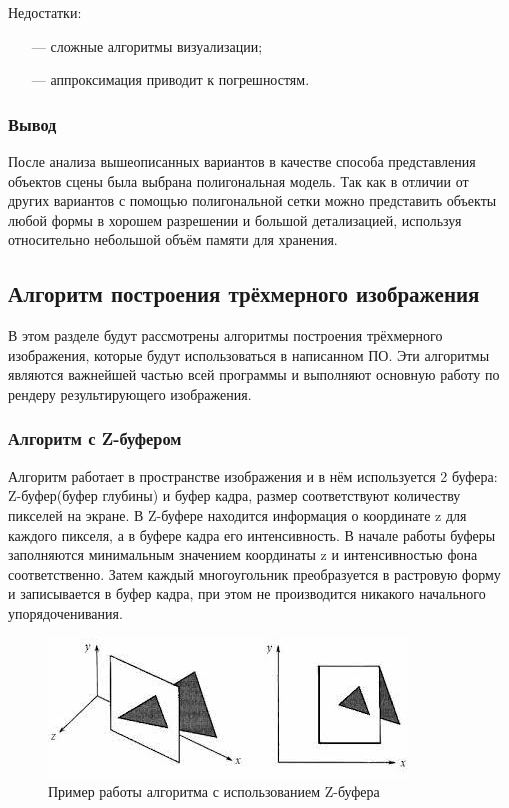 Недостатки:
\begin{itemize}
	\item[---] сложные алгоритмы визуализации;
	\item[---] аппроксимация приводит к погрешностям.
\end{itemize}

\subsubsection{Вывод}

После анализа вышеописанных вариантов в качестве способа представления объектов сцены была выбрана полигональная модель. Так как в отличии от других вариантов с помощью полигональной сетки можно представить объекты любой формы в хорошем разрешении и большой детализацией, используя относительно небольшой объём памяти для хранения.

\subsection{Алгоритм построения трёхмерного изображения}

В этом разделе будут рассмотрены алгоритмы построения трёхмерного изображения, которые будут использоваться в написанном ПО. Эти алгоритмы являются важнейшей частью всей программы и выполняют основную работу по рендеру результирующего изображения.

\subsubsection{Алгоритм с Z-буфером}

Алгоритм работает в пространстве изображения и в нём используется 2 буфера: Z-буфер(буфер глубины) и буфер кадра, размер соответствуют количеству пикселей на экране. В Z-буфере находится информация о координате z для каждого пикселя, а в буфере кадра его интенсивность. В начале работы буферы заполняются минимальным значением координаты z и интенсивностью фона соответственно. Затем каждый многоугольник преобразуется в растровую форму и записывается в буфер кадра, при этом не производится никакого начального упорядоченивания.

\begin{figure}[hbtp]
	\centering
	\includegraphics[scale=0.6]{img/zbuf.jpg}
	\caption{Пример работы алгоритма с использованием Z-буфера}
\end{figure}

